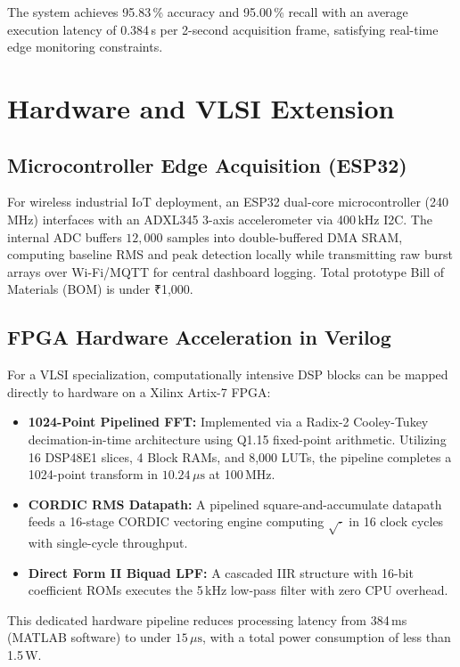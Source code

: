 \documentclass[conference,a4paper]{IEEEtran}
\begin{document}
The system achieves 95.83\,\% accuracy and 95.00\,\% recall with an average execution latency of 0.384\,s per 2-second acquisition frame, satisfying real-time edge monitoring constraints.

\section{Hardware and VLSI Extension}

\subsection{Microcontroller Edge Acquisition (ESP32)}
For wireless industrial IoT deployment, an ESP32 dual-core microcontroller (240\,MHz) interfaces with an ADXL345 3-axis accelerometer via 400\,kHz I2C. The internal ADC buffers $12{,}000$ samples into double-buffered DMA SRAM, computing baseline RMS and peak detection locally while transmitting raw burst arrays over Wi-Fi/MQTT for central dashboard logging. Total prototype Bill of Materials (BOM) is under \mbox{\texorpdfstring{₹}{Rs.}1{,}000}.

\subsection{FPGA Hardware Acceleration in Verilog}
For a VLSI specialization, computationally intensive DSP blocks can be mapped directly to hardware on a Xilinx Artix-7 FPGA:
\begin{itemize}
    \item \textbf{1024-Point Pipelined FFT:} Implemented via a Radix-2 Cooley-Tukey decimation-in-time architecture using Q1.15 fixed-point arithmetic. Utilizing 16 DSP48E1 slices, 4 Block RAMs, and 8{,}000 LUTs, the pipeline completes a 1024-point transform in $10.24\,\mu\text{s}$ at 100\,MHz.
    \item \textbf{CORDIC RMS Datapath:} A pipelined square-and-accumulate datapath feeds a 16-stage CORDIC vectoring engine computing $\sqrt{\cdot}$ in 16 clock cycles with single-cycle throughput.
    \item \textbf{Direct Form II Biquad LPF:} A cascaded IIR structure with 16-bit coefficient ROMs executes the 5\,kHz low-pass filter with zero CPU overhead.
\end{itemize}
This dedicated hardware pipeline reduces processing latency from 384\,ms (MATLAB software) to under $15\,\mu\text{s}$, with a total power consumption of less than 1.5\,W.
\end{document}
